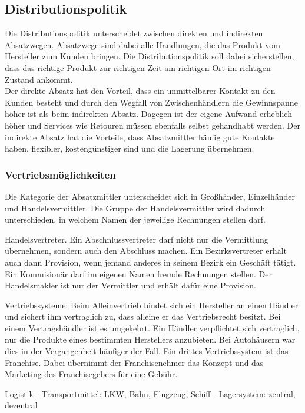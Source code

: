 {\subsection{Distributionspolitik}

Die Distributionspolitik unterscheidet zwischen direkten und indirekten Absatzwegen. Absatzwege sind dabei alle Handlungen, die das Produkt vom Hersteller zum Kunden bringen. Die Distributionspolitik soll dabei sicherstellen, dass das richtige Produkt zur richtigen Zeit am richtigen Ort im richtigen Zustand ankommt.\\

Der direkte Absatz hat den Vorteil, dass ein unmittelbarer Kontakt zu den Kunden besteht und durch den Wegfall von Zwischenhändlern die Gewinnspanne höher ist als beim indirekten Absatz. Dagegen ist der eigene Aufwand erheblich höher und Services wie Retouren müssen ebenfalls selbst gehandhabt werden. Der indirekte Absatz hat die Vorteile, dass Absatzmittler häufig gute Kontakte haben, flexibler, kostengünstiger sind und die Lagerung übernehmen.

\subsubsection{Vertriebsmöglichkeiten}

Die Kategorie der Absatzmittler unterscheidet sich in Großhänder, Einzelhänder und Handelsvermittler. Die Gruppe der Handelsvermittler wird dadurch unterschieden, in welchem Namen der jeweilige Rechnungen stellen darf.

Handelsvertreter. Ein Abschnlussvertreter darf nicht nur die Vermittlung übernehmen, sondern auch den Abschluss machen. Ein Bezirksvertreter erhält auch dann Provision, wenn jemand anderes in seinem Bezirk ein Geschäft tätigt. Ein Kommisionär darf im eigenen Namen fremde Rechnungen stellen. Der Handelsmakler ist nur der Vermittler und erhält dafür eine Provision.

	
Vertriebssysteme: Beim Alleinvertrieb bindet sich ein Hersteller an einen Händler und sichert ihm vertraglich zu, dass alleine er das Vertriebsrecht besitzt. Bei einem Vertragshändler ist es umgekehrt. Ein Händler verpflichtet sich vertraglich, nur die Produkte eines bestimmten Herstellers anzubieten. Bei Autohäusern war dies in der Vergangenheit häufiger der Fall. Ein drittes Vertriebssystem ist das Franchise. Dabei übernimmt der Franchisenehmer das Konzept und das Marketing des Franchisegebers für eine Gebühr.

Logistik
- Transportmittel: LKW, Bahn, Flugzeug, Schiff
- Lagersystem: zentral, dezentral

}

